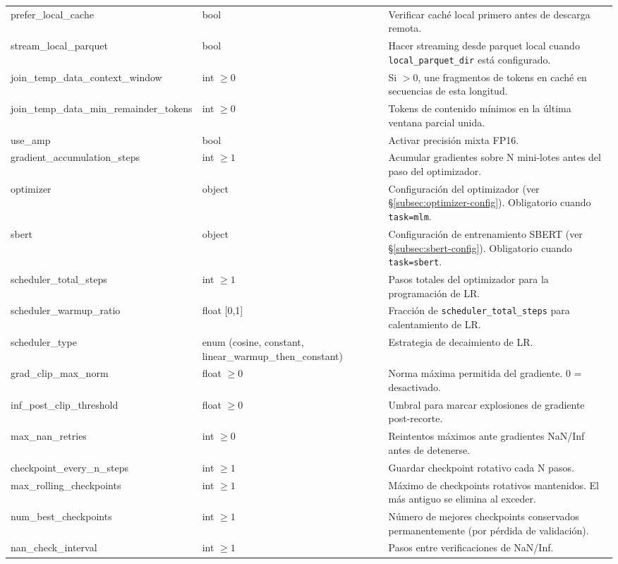 \begin{longtable}{>{\ttfamily}l>{\raggedright\arraybackslash}p{3.5cm}>{\raggedright\arraybackslash}p{8.5cm}}
prefer\_local\_cache & bool & Verificar caché local primero antes de descarga remota. \\
stream\_local\_parquet & bool & Hacer streaming desde parquet local cuando \texttt{local\_parquet\_dir} está configurado. \\
join\_temp\_data\_context\_window & int $\ge 0$ & Si $>0$, une fragmentos de tokens en caché en secuencias de esta longitud. \\
join\_temp\_data\_min\_remainder\_tokens & int $\ge 0$ & Tokens de contenido mínimos en la última ventana parcial unida. \\
use\_amp & bool & Activar precisión mixta FP16. \\
gradient\_accumulation\_steps & int $\ge 1$ & Acumular gradientes sobre N mini-lotes antes del paso del optimizador. \\
optimizer & object & Configuración del optimizador (ver \S\ref{subsec:optimizer-config}). Obligatorio cuando \texttt{task=mlm}. \\
sbert & object & Configuración de entrenamiento SBERT (ver \S\ref{subsec:sbert-config}). Obligatorio cuando \texttt{task=sbert}. \\
scheduler\_total\_steps & int $\ge 1$ & Pasos totales del optimizador para la programación de LR. \\
scheduler\_warmup\_ratio & float [0,1] & Fracción de \texttt{scheduler\_total\_steps} para calentamiento de LR. \\
scheduler\_type & enum (cosine, constant, linear\_warmup\_then\_constant) & Estrategia de decaimiento de LR. \\
grad\_clip\_max\_norm & float $\ge 0$ & Norma máxima permitida del gradiente. 0 = desactivado. \\
inf\_post\_clip\_threshold & float $\ge 0$ & Umbral para marcar explosiones de gradiente post-recorte. \\
max\_nan\_retries & int $\ge 0$ & Reintentos máximos ante gradientes NaN/Inf antes de detenerse. \\
checkpoint\_every\_n\_steps & int $\ge 1$ & Guardar checkpoint rotativo cada N pasos. \\
max\_rolling\_checkpoints & int $\ge 1$ & Máximo de checkpoints rotativos mantenidos. El más antiguo se elimina al exceder. \\
num\_best\_checkpoints & int $\ge 1$ & Número de mejores checkpoints conservados permanentemente (por pérdida de validación). \\
nan\_check\_interval & int $\ge 1$ & Pasos entre verificaciones de NaN/Inf. \\

\end{longtable}
